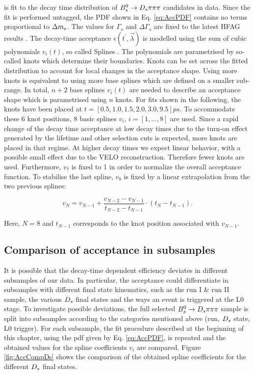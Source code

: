 is fit to the decay time distribution of ${{B}^0_{s}}\rightarrow{\ensuremath{{D}_{s}}}{\ensuremath{\pi}}{\ensuremath{\pi}}{\ensuremath{\pi}}$ candidates in data. 
Since the fit is performed untagged, the PDF shown in Eq. \ref{eq:AccPDF} contains no terms proportional to ${\Delta m_{{s}}}$. 
The values for $\Gamma_{s}$ and $\Delta\Gamma_{s}$ are fixed to the latest HFAG results \cite{HFAG}. 
The decay-time acceptance $\epsilon(t^{'}, \vec{\lambda})$ is modelled using the sum of cubic polynomials $v_{i}(t)$, so called Splines \cite{Karbach:2014qba}. 
The polynomials are parametrised by so-called knots which determine their boundaries. Knots can be set across the fitted distribution to account for local changes in the acceptance shape.
Using more knots is equivalent to using more base splines which are defined on a smaller sub-range. 
In total, $n+2$ base splines $v_{i}(t)$ are needed to describe an acceptance shape which is parametrised using $n$ knots.\newline
For fits shown in the following, the knots have been placed at $t = [0.5, 1.0, 1.5, 2.0, 3.0, 9.5] ps$. To accommodate these 6 knot positions, 8 basic splines $v_{i}$, $i = [1,...,8]$ are used.
Since a rapid change of the decay time acceptance at low decay times due to the turn-on effect generated by the lifetime and other selection cuts is expected, more knots are placed in that regime.
At higher decay times we expect linear behavior, with a possible small effect due to the VELO reconstruction. Therefore fewer knots are used. 
Furthermore, $v_{7}$ is fixed to 1 in order to normalize the overall acceptance function. To stabilise the last spline, $v_{8}$ is fixed by a linear extrapolation from the two previous splines:

\begin{equation}   
v_{N} = v_{N-1} + \frac{v_{N-2} - v_{N-1}}{t_{N-2} - t_{N-1}} \cdot (t_{N} - t_{N-1}).
\label{eq:SplineExtra}
\end{equation}

Here, $N=8$ and $t_{N-1}$ corresponds to the knot position associated with $v_{N-1}$. 

\clearpage

\subsection{Comparison of acceptance in subsamples}
\label{subsec: AccComparison}

It is possible that the decay-time dependent efficiency deviates in different subsamples of our data. 
In particular, the acceptance could differentiate in subsamples with different final state kinematics, such as the run I \& run II sample, the various ${{D}_{s}}$ final states and the ways an event is triggered at the L0 stage.
To investigate possible deviations, the full selected ${{B}^0_{s}}\rightarrow{\ensuremath{{D}_{s}}}{\ensuremath{\pi}}{\ensuremath{\pi}}{\ensuremath{\pi}}$ sample is split into subsamples according to the categories mentioned above (run, ${{D}_{s}}$ state, L0 trigger). 
For each subsample, the fit procedure described at the beginning of this chapter, using the pdf given by Eq. \ref{eq:AccPDF}, is repeated and the obtained values for the spline coefficients  $v_{i}$ are compared.
Figure \ref{fig:AccCompDs} shows the comparison of the obtained spline coefficients for the different ${{D}_{s}}$ final states.


